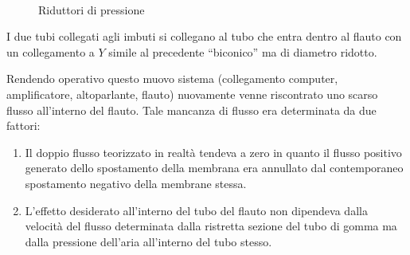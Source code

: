 \begin{figure}[t!]
\centering
{} \\
\caption{Riduttori di pressione}
\label{fig:example}
\end{figure}

I due tubi collegati agli imbuti si collegano al tubo che entra dentro al flauto con un collegamento a $Y$ simile al precedente “biconico” ma di diametro ridotto.

Rendendo operativo questo muovo sistema (collegamento computer, amplificatore, altoparlante, flauto) nuovamente venne riscontrato uno scarso flusso all’interno del flauto. Tale mancanza di flusso era determinata da due fattori:

\begin{enumerate}
  \item Il doppio flusso teorizzato in realtà tendeva a zero in quanto il flusso positivo generato dello spostamento della membrana era annullato dal contemporaneo spostamento negativo della membrane stessa.
  \item L’effetto desiderato all’interno del tubo del flauto non dipendeva dalla         velocità del flusso determinata dalla ristretta sezione del tubo di gomma ma dalla pressione dell’aria all’interno del tubo stesso.
\end{enumerate}

